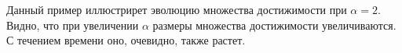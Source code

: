\documentclass[11pt]{article}
\begin{document}
\newpage
{}
Данный пример иллюстрирет эволюцию множества достижимости при \( \alpha = 2 \). Видно, что при увеличении \( \alpha \) размеры множества достижимости увеличиваются. С течением времени оно, очевидно, также растет.
\begin{figure}[h]
    \centering
    \qquad
    \\
    \qquad
\end{figure}
\end{document}
